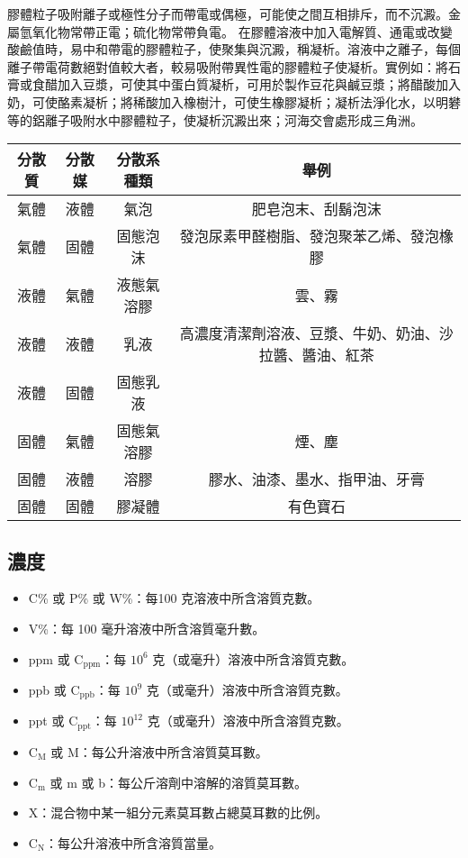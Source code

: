 \documentclass[a4paper,12pt]{article}
\begin{document}
膠體粒子吸附離子或極性分子而帶電或偶極，可能使之間互相排斥，而不沉澱。金屬氫氧化物常帶正電；硫化物常帶負電。
在膠體溶液中加入電解質、通電或改變酸鹼值時，易中和帶電的膠體粒子，使聚集與沉澱，稱凝析。溶液中之離子，每個離子帶電荷數絕對值較大者，較易吸附帶異性電的膠體粒子使凝析。實例如：將石膏或食醋加入豆漿，可使其中蛋白質凝析，可用於製作豆花與鹹豆漿；將醋酸加入奶，可使酪素凝析；將稀酸加入橡樹汁，可使生橡膠凝析；凝析法淨化水，以明礬等的鋁離子吸附水中膠體粒子，使凝析沉澱出來；河海交會處形成三角洲。
\begin{longtable}[c]{|c|c|c|c|}
\hline
分散質 & 分散媒 & 分散系種類 & 舉例 \\\hline\endhead
氣體 & 液體 & 氣泡 & 肥皂泡末、刮鬍泡沫 \\\hline
氣體 & 固體 & 固態泡沫 & 發泡尿素甲醛樹脂、發泡聚苯乙烯、發泡橡膠 \\\hline
液體 & 氣體 & 液態氣溶膠 & 雲、霧 \\\hline
液體 & 液體 & 乳液 & 高濃度清潔劑溶液、豆漿、牛奶、奶油、沙拉醬、醬油、紅茶 \\\hline
液體 & 固體 & 固態乳液 & \\\hline
固體 & 氣體 & 固態氣溶膠 & 煙、塵 \\\hline
固體 & 液體 & 溶膠 & 膠水、油漆、墨水、指甲油、牙膏 \\\hline
固體 & 固體 & 膠凝體 & 有色寶石 \\\hline
\end{longtable}\FB
\subsection{濃度}
\begin{itemize}
    \item {} C\% 或 P\% 或 W\%：每100 克溶液中所含溶質克數。
    \item {} V\%：每 100 毫升溶液中所含溶質毫升數。
    \item {} ppm 或 C$_\text{ppm}$：每 $10^6$ 克（或毫升）溶液中所含溶質克數。
    \item {} ppb 或 C$_\text{ppb}$：每 $10^9$ 克（或毫升）溶液中所含溶質克數。
    \item {} ppt 或 C$_\text{ppt}$：每 $10^{12}$ 克（或毫升）溶液中所含溶質克數。
    \item {} C$_\text{M}$ 或 M：每公升溶液中所含溶質莫耳數。
    \item {} C$_\text{m}$ 或 m 或 b：每公斤溶劑中溶解的溶質莫耳數。
    \item {} X：混合物中某一組分元素莫耳數占總莫耳數的比例。
    \item {} C$_\text{N}$：每公升溶液中所含溶質當量。
\end{itemize}
\end{document}
